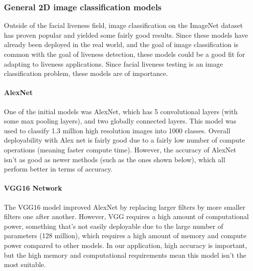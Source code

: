 \documentclass[11pt,a4paper]{article}
\begin{document}
        \subsubsection{General 2D image classification models}
        Outside of the facial liveness field, image classification on the ImageNet dataset has proven popular and yielded some fairly good
        results. Since these models have already been deployed in the real world, and the goal of image classification is common with the
        goal of liveness detection, these models could be a good fit for adapting to liveness applications. Since facial liveness testing is
        an image classification problem, these models are of importance.
        
        \paragraph{AlexNet} 
        One of the initial models was AlexNet, which has 5 convolutional layers (with some max pooling layers), and two globally connected layers.
        This model was used to classify 1.3 million high resolution images into 1000 classes. \cite{AlexNet} Overall deployability
        with Alex net is fairly good due to a fairly low number of compute operations (meaning faster compute time). \cite{DeepNeuralNetworkDeployability} However, the accuracy of AlexNet isn't
        as good as newer methods (such as the ones shown below), which all perform better in terms of accuracy. 
        
        \paragraph{VGG16 Network}
        The VGG16 model improved AlexNet by replacing larger filters by more smaller filters one after another.
        However, VGG requires a high amount of computational power, something that's not easily deployable due to
        the large number of parameters (128 million), which requires a high amount of memory and compute power compared
        to other models. \cite{DeepNeuralNetworkDeployability} In our application, high accuracy is important, but the high
        memory and computational requirements mean this model isn't the most suitable.
\end{document}
